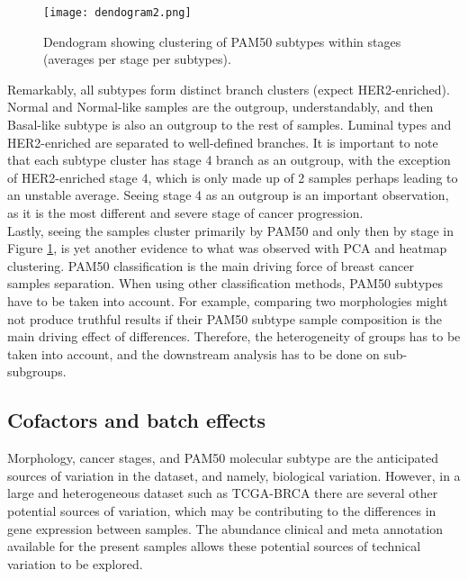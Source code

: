             \begin{figure}[!h]
            \centering
            \texttt{[image: dendogram2.png]}
            \caption[Dendogram of PAM50 and stage subgroups clustering]{Dendogram showing clustering of PAM50 subtypes within stages (averages per stage per subtypes).}
            \label{fig:dendogram}
            \end{figure}
    
    Remarkably, all subtypes form distinct branch clusters (expect HER2-enriched). Normal and Normal-like samples are the outgroup, understandably, and then Basal-like subtype is also an outgroup to the rest of samples. Luminal types and HER2-enriched are separated to well-defined branches. It is important to note that each subtype cluster has stage 4 branch as an outgroup, with the exception of HER2-enriched stage 4, which is only made up of 2 samples perhaps leading to an unstable average. Seeing stage 4 as an outgroup is an important observation, as it is the most different and severe stage of cancer progression. \\
    
    Lastly, seeing the samples cluster primarily by PAM50 and only then by stage in Figure \ref{fig:dendogram}, is yet another evidence to what was observed with PCA and heatmap clustering. PAM50 classification is the main driving force of breast cancer samples separation. When using other classification methods, PAM50 subtypes have to be taken into account. For example, comparing two morphologies might not produce truthful results if their PAM50 subtype sample composition is the main driving effect of differences. Therefore, the heterogeneity of groups has to be taken into account, and the downstream analysis has to be done on sub-subgroups.  
    

    
    \newpage
    \subsection{Cofactors and batch effects}
    
    Morphology, cancer stages, and PAM50 molecular subtype are the anticipated sources of variation in the dataset, and namely, biological variation. However, in a large and heterogeneous dataset such as TCGA-BRCA there are several other potential sources of variation, which may be contributing to the differences in gene expression between samples. The abundance clinical and meta annotation available for the present samples allows these potential sources of technical variation to be explored.
    
